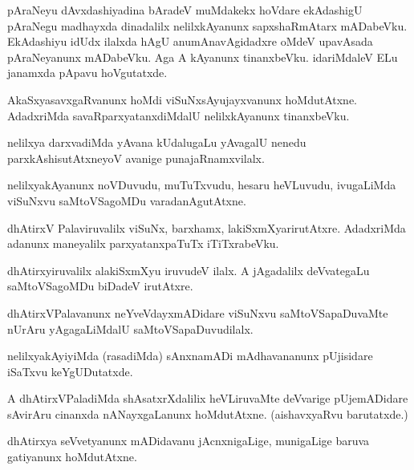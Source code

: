 \documentclass{article}
\begin{document}
\begin{mng}%
pAraNeyu dAvxdashiyadina bAradeV muMdakekx hoVdare ekAdashigU pAraNegu 
madhayxda dinadalilx nelilxkAyanunx sapxshaRmAtarx mADabeVku. 
EkAdashiyu idUdx ilalxda hAgU anumAnavAgidadxre oMdeV upavAsada 
pAraNeyanunx mADabeVku. Aga A kAyanunx tinanxbeVku. idariMdaleV ELu 
janamxda pApavu hoVgutatxde.
\end{mng}

\begin{mng}%
AkaSxyasavxgaRvanunx hoMdi viSuNxsAyujayxvanunx hoMdutAtxne. 
AdadxriMda savaRparxyatanxdiMdalU nelilxkAyanunx tinanxbeVku.
\end{mng}

\begin{mng}%
nelilxya darxvadiMda yAvana kUdalugaLu yAvagalU nenedu 
parxkAshisutAtxneyoV avanige punajaRnamxvilalx.
\end{mng}

\begin{mng}%
nelilxyakAyanunx noVDuvudu, muTuTxvudu, hesaru heVLuvudu, ivugaLiMda 
viSuNxvu saMtoVSagoMDu varadanAgutAtxne.
\end{mng}

\begin{mng}%
dhAtirxV Palaviruvalilx viSuNx, barxhamx, lakiSxmXyarirutAtxre. 
AdadxriMda adanunx maneyalilx parxyatanxpaTuTx iTiTxrabeVku.
\end{mng}

\begin{mng}%
dhAtirxyiruvalilx alakiSxmXyu iruvudeV ilalx. A jAgadalilx deVvategaLu 
saMtoVSagoMDu biDadeV irutAtxre.
\end{mng}

\begin{mng}%
dhAtirxVPalavanunx neYveVdayxmADidare viSuNxvu saMtoVSapaDuvaMte 
nUrAru yAgagaLiMdalU saMtoVSapaDuvudilalx.
\end{mng}

\begin{mng}%
nelilxyakAyiyiMda (rasadiMda) sAnxnamADi mAdhavananunx pUjisidare 
iSaTxvu keYgUDutatxde.
\end{mng}

\begin{mng}%
A dhAtirxVPaladiMda shAsatxrXdalilix heVLiruvaMte deVvarige 
pUjemADidare sAvirAru cinanxda nANayxgaLanunx hoMdutAtxne. 
(aishavxyaRvu barutatxde.)
\end{mng}

\begin{mng}%
dhAtirxya seVvetyanunx mADidavanu jAcnxnigaLige, munigaLige baruva 
gatiyanunx hoMdutAtxne.
\end{mng}
\end{document}
